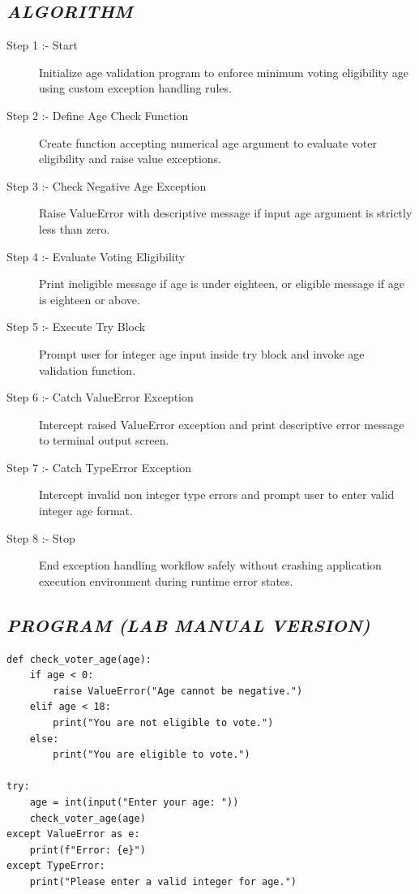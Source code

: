 \documentclass[11pt,a4paper]{article}
\begin{document}
\subsection*{\textit{ALGORITHM}}
\begin{description}
  \item[Step 1 :- Start] Initialize age validation program to enforce minimum voting eligibility age using custom exception handling rules.
  \item[Step 2 :- Define Age Check Function] Create function accepting numerical age argument to evaluate voter eligibility and raise value exceptions.
  \item[Step 3 :- Check Negative Age Exception] Raise ValueError with descriptive message if input age argument is strictly less than zero.
  \item[Step 4 :- Evaluate Voting Eligibility] Print ineligible message if age is under eighteen, or eligible message if age is eighteen or above.
  \item[Step 5 :- Execute Try Block] Prompt user for integer age input inside try block and invoke age validation function.
  \item[Step 6 :- Catch ValueError Exception] Intercept raised ValueError exception and print descriptive error message to terminal output screen.
  \item[Step 7 :- Catch TypeError Exception] Intercept invalid non integer type errors and prompt user to enter valid integer age format.
  \item[Step 8 :- Stop] End exception handling workflow safely without crashing application execution environment during runtime error states.
\end{description}

\subsection*{\textit{PROGRAM (LAB MANUAL VERSION)}}
\begin{lstlisting}[style=pythonstyle]
def check_voter_age(age): 
    if age < 0: 
        raise ValueError("Age cannot be negative.") 
    elif age < 18: 
        print("You are not eligible to vote.") 
    else: 
        print("You are eligible to vote.") 

try: 
    age = int(input("Enter your age: ")) 
    check_voter_age(age) 
except ValueError as e: 
    print(f"Error: {e}") 
except TypeError: 
    print("Please enter a valid integer for age.")
\end{lstlisting}
\end{document}
